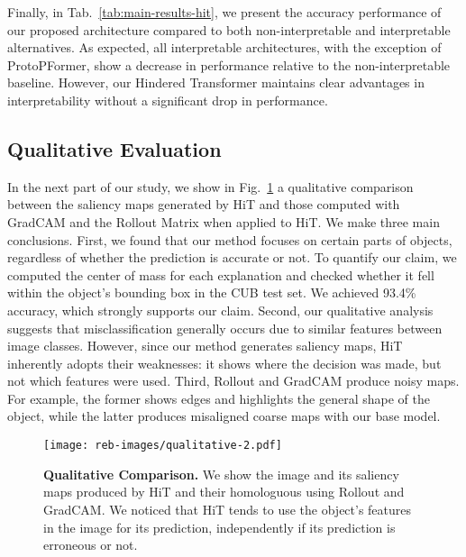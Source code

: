 Finally, in Tab.~\ref{tab:main-results-hit}, we present the accuracy performance of our proposed architecture compared to both non-interpretable and interpretable alternatives. As expected, all interpretable architectures, with the exception of ProtoPFormer, show a decrease in performance relative to the non-interpretable baseline. However, our Hindered Transformer maintains clear advantages in interpretability without a significant drop in performance.



\subsection{Qualitative Evaluation}




In the next part of our study, we show in Fig.~\ref{fig:qualitative-hit} a qualitative comparison between the saliency maps generated by HiT and those computed with GradCAM and the Rollout Matrix when applied to HiT. We make three main conclusions. First, we found that our method focuses on certain parts of objects, regardless of whether the prediction is accurate or not. To quantify our claim, we computed the center of mass for each explanation and checked whether it fell within the object's bounding box in the CUB test set. We achieved 93.4\% accuracy, which strongly supports our claim. Second, our qualitative analysis suggests that misclassification generally occurs due to similar features between image classes. However, since our method generates saliency maps, HiT inherently adopts their weaknesses: it shows where the decision was made, but not which features were used. Third, Rollout and GradCAM produce noisy maps. For example, the former shows edges and highlights the general shape of the object, while the latter produces misaligned coarse maps with our base model.

\begin{figure}[t]
    \centering
    \texttt{[image: reb-images/qualitative-2.pdf]}
    \caption{\textbf{Qualitative Comparison.} We show the image and its saliency maps produced by HiT and their homologuous using Rollout and GradCAM. We noticed that HiT tends to use the object's features in the image for its prediction, independently if its prediction is erroneous or not.}
    \label{fig:qualitative-hit}
    \vspace{-3mm}
\end{figure}



